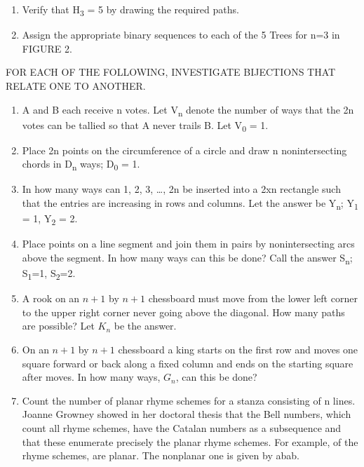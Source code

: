 \documentclass[10pt,letter]{article}
\begin{document}
\begin{enumerate}
\def\labelenumi{\arabic{enumi}.}

\item
  Verify that H\textsubscript{3} = 5 by drawing the required paths.
\item
  Assign the appropriate binary sequences to each of the 5 Trees for n=3
  in FIGURE 2.

\end{enumerate}

FOR EACH OF THE FOLLOWING, INVESTIGATE BIJECTIONS THAT RELATE ONE TO
ANOTHER.

\begin{enumerate}
\def\labelenumi{\arabic{enumi}.}

\item
  A and B each receive n votes. Let V\textsubscript{n} denote the number
  of ways that the 2n votes can be tallied so that A never trails B. Let
  V\textsubscript{0} = 1.
\item
  Place 2n points on the circumference of a circle and draw n
  nonintersecting chords in D\textsubscript{n} ways; D\textsubscript{0}
  = 1.
\item
  In how many ways can 1, 2, 3, \ldots{}, 2n be inserted into a 2xn
  rectangle such that the entries are increasing in rows and columns.
  Let the answer be Y\textsubscript{n}; Y\textsubscript{1} = 1,
  Y\textsubscript{2} = 2.
\item
  Place points on a line segment and join them in pairs by
  nonintersecting arcs above the segment. In how many ways can this be
  done? Call the answer S\textsubscript{n}; S\textsubscript{1}=1,
  S\textsubscript{2}=2.
\item
  A rook on an \(n + 1\) by \(n + 1\) chessboard must move from the
  lower left corner to the upper right corner never going above the
  diagonal. How many paths are possible? Let \(K_{n}\) be the answer.
\item
  On an \(n + 1\) by \(n + 1\) chessboard a king starts on the first row
  and moves one square forward or back along a fixed column and ends on
  the starting square after moves. In how many ways, \(G_{n}\), can this
  be done?
\item
  Count the number of planar rhyme schemes for a stanza consisting of n
  lines. Joanne Growney showed in her doctoral thesis that the Bell
  numbers, which count all rhyme schemes, have the Catalan numbers as a
  subsequence and that these enumerate precisely the planar rhyme
  schemes. For example, of the rhyme schemes, are planar. The nonplanar
  one is given by abab.

\end{enumerate}
\end{document}
